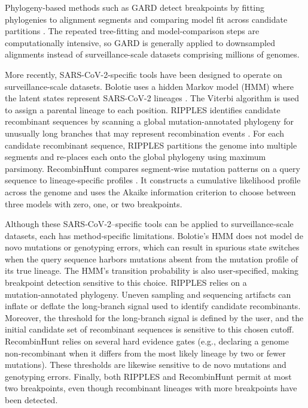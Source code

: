 \documentclass[11pt,oneside,letterpaper]{article}
\begin{document}

Phylogeny-based methods such as GARD detect breakpoints by fitting phylogenies to alignment segments and comparing model fit across candidate partitions \cite{kosakovsky_pond_gard_2006}. The repeated tree-fitting and model-comparison steps are computationally intensive, so GARD is generally applied to downsampled alignments instead of surveillance-scale datasets comprising millions of genomes.

More recently, SARS-CoV-2-specific tools have been designed to operate on surveillance-scale datasets. Bolotie uses a hidden Markov model (HMM) where the latent states represent SARS-CoV-2 lineages \cite{varabyou_rapid_2021}. The Viterbi algorithm is used to assign a parental lineage to each position. RIPPLES identifies candidate recombinant sequences by scanning a global mutation-annotated phylogeny for unusually long branches that may represent recombination events \cite{turakhia_pandemic-scale_2022}. For each candidate recombinant sequence, RIPPLES partitions the genome into multiple segments and re-places each onto the global phylogeny using maximum parsimony. RecombinHunt compares segment‑wise mutation patterns on a query sequence to lineage‑specific profiles \cite{alfonsi_data-driven_2024}. It constructs a cumulative likelihood profile across the genome and uses the Akaike information criterion to choose between three models with zero, one, or two breakpoints.

Although these SARS‑CoV‑2–specific tools can be applied to surveillance‑scale datasets, each has method‑specific limitations. Bolotie’s HMM does not model de novo mutations or genotyping errors, which can result in spurious state switches when the query sequence harbors mutations absent from the mutation profile of its true lineage. The HMM’s transition probability is also user‑specified, making breakpoint detection sensitive to this choice. RIPPLES relies on a mutation‑annotated phylogeny. Uneven sampling and sequencing artifacts can inflate or deflate the long‑branch signal used to identify candidate recombinants. Moreover, the threshold for the long-branch signal is defined by the user, and the initial candidate set of recombinant sequences is sensitive to this chosen cutoff. RecombinHunt relies on several hard evidence gates (e.g., declaring a genome non‑recombinant when it differs from the most likely lineage by two or fewer mutations). These thresholds are likewise sensitive to de novo mutations and genotyping errors. Finally, both RIPPLES and RecombinHunt permit at most two breakpoints, even though recombinant lineages with more breakpoints have been detected.
\end{document}
